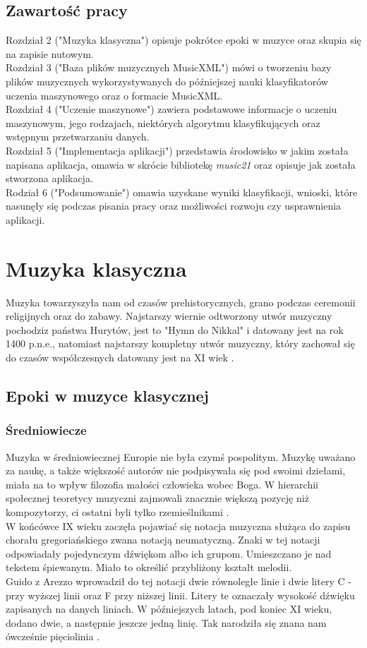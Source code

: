 \documentclass[printmode, eng]{mgr}
\newcommand\tab[1][1cm]{\hspace*{#1}}
\begin{document}
\section{Zawartość pracy}
\tab Rozdział 2 ("Muzyka klasyczna") opisuje pokrótce epoki w muzyce oraz skupia się na zapisie nutowym.\\
\tab Rozdział 3 ("Baza plików muzycznych MusicXML") mówi o tworzeniu bazy plików muzycznych wykorzystywanych do późniejszej nauki klasyfikatorów uczenia maszynowego oraz o formacie MusicXML.\\ 
\tab Rozdział 4 ("Uczenie maszynowe") zawiera podstawowe informacje o uczeniu maszynowym, jego rodzajach, niektórych algorytmu klasyfikujących oraz wstępnym przetwarzaniu danych.\\ 
\tab Rozdział 5 ("Implementacja aplikacji") przedstawia środowisko w jakim została napisana aplikacja, omawia w skrócie bibliotekę \textit{music21} oraz opisuje jak została stworzona aplikacja.\\ 
\tab Rodział 6 ("Podsumowanie") omawia uzyskane wyniki klasyfikacji, wnioski, które nasunęły się podczas pisania pracy oraz możliwości rozwoju czy usprawnienia aplikacji. \\ 
\chapter{Muzyka klasyczna}
\tab Muzyka towarzyszyła nam od czasów prehistorycznych, grano podczas ceremonii religijnych oraz do zabawy. Najstarszy wiernie odtworzony utwór muzyczny pochodzi\linebreak z państwa Hurytów, jest to "Hymn do Nikkal" i datowany jest na rok 1400 p.n.e., natomiast najstarszy kompletny utwór muzyczny, który zachował się do czasów współczesnych datowany jest na XI wiek  \cite{oldest}.
\section{Epoki w muzyce klasycznej}
\subsection{Średniowiecze}
\tab Muzyka w średniowiecznej Europie nie była czymś pospolitym. Muzykę uważano za naukę, a także większość autorów nie podpisywała się pod swoimi dziełami, miała na to wpływ filozofia małości człowieka wobec Boga. W hierarchii społecznej teoretycy muzyczni zajmowali znacznie większą pozycję niż kompozytorzy, ci ostatni byli tylko rzemieślnikami \cite{sred}.  \\
\tab W końcówce IX wieku zaczęła pojawiać się notacja muzyczna służąca do zapisu chorału gregoriańskiego zwana notacją neumatyczną. Znaki w tej notacji odpowiadały pojedynczym dźwiękom albo ich grupom. Umieszczano je nad tekstem śpiewanym. Miało to określić przybliżony kształt melodii. \\
\tab Guido z Arezzo wprowadził do tej notacji dwie równoległe linie i dwie litery C - przy wyższej linii oraz F przy niższej linii. Litery te oznaczały wysokość dźwięku zapisanych na danych liniach. W późniejszych latach, pod koniec XI wieku, dodano dwie, a następnie jeszcze jedną linię. Tak narodziła się znana nam ówcześnie pięciolinia \cite{neum}. 
\end{document}
